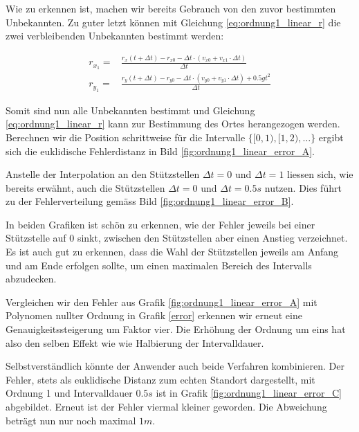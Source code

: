 Wie zu erkennen ist, machen wir bereits Gebrauch von den zuvor bestimmten Unbekannten. Zu guter letzt können mit Gleichung \ref{eq:ordnung1_linear_r} die zwei verbleibenden Unbekannten bestimmt werden:

\begin{equation}
\label{eq:ordnung1_linear_solutionPart3}
\begin{aligned}
r_{x_1} =& \frac{r_x(t + \Delta t) - r_{x0} - \Delta t \cdot(v_{x0} + v_{x1}  \cdot \Delta t)}{\Delta t} \\
r_{y_1} =& \frac{r_y(t + \Delta t) - r_{y0} - \Delta t \cdot(v_{y0} + v_{y1}  \cdot \Delta t) + 0.5gt^2}{\Delta t}
\end{aligned}
\end{equation}


Somit sind nun alle Unbekannten bestimmt und Gleichung \eqref{eq:ordnung1_linear_r} kann zur Bestimmung des Ortes herangezogen werden. Berechnen wir die Position schrittweise für die Intervalle $\{[0,1), [1, 2), \dots\}$ ergibt sich die euklidische Fehlerdistanz in Bild \ref{fig:ordnung1_linear_error_A}.

Anstelle der Interpolation an den Stützstellen $\Delta t = 0$ und $\Delta t = 1$ liessen sich, wie bereits erwähnt, auch die Stützstellen $\Delta t = 0$ und $\Delta t = 0.5s$ nutzen. Dies führt zu der Fehlerverteilung gemäss Bild \ref{fig:ordnung1_linear_error_B}.

In beiden Grafiken ist schön zu erkennen, wie der Fehler jeweils bei einer Stützstelle auf $0$ sinkt, zwischen den Stützstellen aber einen Anstieg verzeichnet. Es ist auch gut zu erkennen, dass die Wahl der Stützstellen jeweils am Anfang und am Ende erfolgen sollte, um einen maximalen Bereich des Intervalls abzudecken. 

Vergleichen wir den Fehler aus Grafik \ref{fig:ordnung1_linear_error_A} mit Polynomen nullter Ordnung in Grafik \ref{error} erkennen wir erneut eine Genauigkeitssteigerung um Faktor vier. Die Erhöhung der Ordnung um eins hat also den selben Effekt wie wie Halbierung der Intervalldauer.

Selbstverständlich könnte der Anwender auch beide Verfahren kombinieren. Der Fehler, stets als euklidische Distanz zum echten Standort dargestellt, mit Ordnung 1 und Intervalldauer $0.5s$ ist in Grafik \ref{fig:ordnung1_linear_error_C} abgebildet. Erneut ist der Fehler viermal kleiner geworden. Die Abweichung beträgt nun nur noch maximal $1m$.

